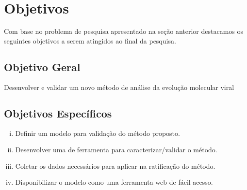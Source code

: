 \chapter{Objetivos}

Com base no problema de pesquisa apresentado na seção anterior destacamos os seguintes objetivos a serem atingidos ao final da pesquisa.
\section{Objetivo Geral}
Desenvolver e validar um novo método de análise da evolução molecular viral

\section{Objetivos Específicos}
\begin{enumerate}[(i)]
  \item Definir um modelo para validação do método proposto.
  \item Desenvolver uma de ferramenta para caracterizar/validar o método.
  \item Coletar os dados necessários para aplicar na ratificação do método.
  \item Disponibilizar o modelo como uma ferramenta web de fácil acesso.
\end{enumerate}